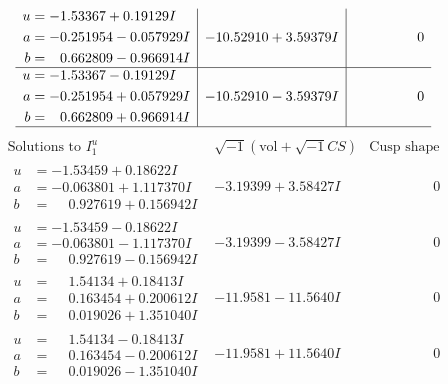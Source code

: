 \documentclass[1p]{elsarticle_modified}
\theoremstyle{definition}
\newcommand{\I}{\sqrt{-1}}
\begin{document}
$$\begin{array}{c|c|c}
\begin{aligned}
u &= -1.53367 + 0.19129 I \\
a &= -0.251954 - 0.057929 I \\
b &= \phantom{-}0.662809 - 0.966914 I\end{aligned}
 & -10.52910 + 3.59379 I & \phantom{-0.000000 } 0 \\ \hline\begin{aligned}
u &= -1.53367 - 0.19129 I \\
a &= -0.251954 + 0.057929 I \\
b &= \phantom{-}0.662809 + 0.966914 I\end{aligned}
 & -10.52910 - 3.59379 I & \phantom{-0.000000 } 0\\
 \hline 
 \end{array}$$\newpage$$\begin{array}{c|c|c}  
\text{Solutions to }I^u_{1}& \I (\text{vol} + \sqrt{-1}CS) & \text{Cusp shape}\\
 \hline 
\begin{aligned}
u &= -1.53459 + 0.18622 I \\
a &= -0.063801 + 1.117370 I \\
b &= \phantom{-}0.927619 + 0.156942 I\end{aligned}
 & -3.19399 + 3.58427 I & \phantom{-0.000000 } 0 \\ \hline\begin{aligned}
u &= -1.53459 - 0.18622 I \\
a &= -0.063801 - 1.117370 I \\
b &= \phantom{-}0.927619 - 0.156942 I\end{aligned}
 & -3.19399 - 3.58427 I & \phantom{-0.000000 } 0 \\ \hline\begin{aligned}
u &= \phantom{-}1.54134 + 0.18413 I \\
a &= \phantom{-}0.163454 + 0.200612 I \\
b &= \phantom{-}0.019026 + 1.351040 I\end{aligned}
 & -11.9581 - 11.5640 I & \phantom{-0.000000 } 0 \\ \hline\begin{aligned}
u &= \phantom{-}1.54134 - 0.18413 I \\
a &= \phantom{-}0.163454 - 0.200612 I \\
b &= \phantom{-}0.019026 - 1.351040 I\end{aligned}
 & -11.9581 + 11.5640 I & \phantom{-0.000000 } 0 \\ \hline\begin{aligned}

\end{aligned}
\end{array}$$
\end{document}
